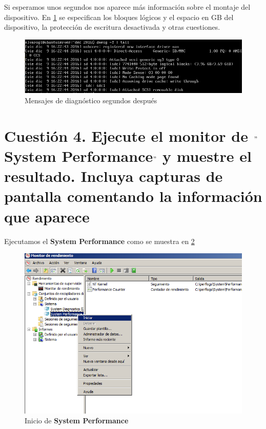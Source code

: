 Si esperamos unos segundos nos aparece más información sobre el montaje del dispositivo. En \ref{cuestion3-usb3} se especifican los bloques lógicos y el espacio en GB del dispositivo, la protección de escritura desactivada y otras cuestiones.

\begin{figure}[H]
	\centering
	\includegraphics[scale=0.6]{cuestion3-usb3.png}
	\caption{Mensajes de diagnóstico segundos después} \label{cuestion3-usb3}
\end{figure}

\newpage

\section{Cuestión 4. Ejecute el monitor de $"$System Performance$"$ y muestre el resultado. Incluya capturas de pantalla comentando la información que aparece}

Ejecutamos el \textbf{System Performance} como se muestra en \ref{cuestion4-inicio}

\begin{figure}[H]
	\centering
	\includegraphics[scale=0.6]{cuestion4-inicio.png}
	\caption{Inicio de \textbf{System Performance}} \label{cuestion4-inicio}
\end{figure}

